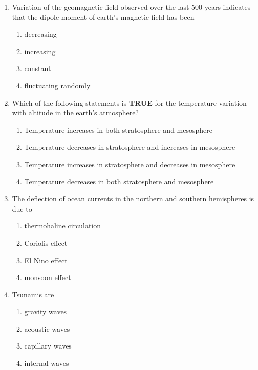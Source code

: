 \documentclass[journal,12pt,onecolumn]{IEEEtran}
\theoremstyle{remark}
\begin{document}
\begin{enumerate}
\item Variation of the geomagnetic field observed over the last 500 years indicates that the dipole moment of earth's magnetic field has been
\begin{multicols}{2}
\begin{enumerate}
\item decreasing  
\item increasing  
\item constant  
\item fluctuating randomly  
\end{enumerate}
\end{multicols}

\item Which of the following statements is \textbf{TRUE} for the temperature variation with altitude in the earth's atmosphere?
\begin{enumerate}
\item Temperature increases in both stratosphere and mesosphere  
\item Temperature decreases in stratosphere and increases in mesosphere  
\item Temperature increases in stratosphere and decreases in mesosphere  
\item Temperature decreases in both stratosphere and mesosphere  
\end{enumerate}

\item The deflection of ocean currents in the northern and southern hemispheres is due to
\begin{multicols}{2}
\begin{enumerate}
\item thermohaline circulation  
\item Coriolis effect  
\item El Nino effect  
\item monsoon effect  
\end{enumerate}
\end{multicols}

\item Tsunamis are
\begin{multicols}{2}
\begin{enumerate}
\item gravity waves  
\item acoustic waves  
\item capillary waves  
\item internal waves  
\end{enumerate}
\end{multicols}


\end{enumerate}
\end{document}
